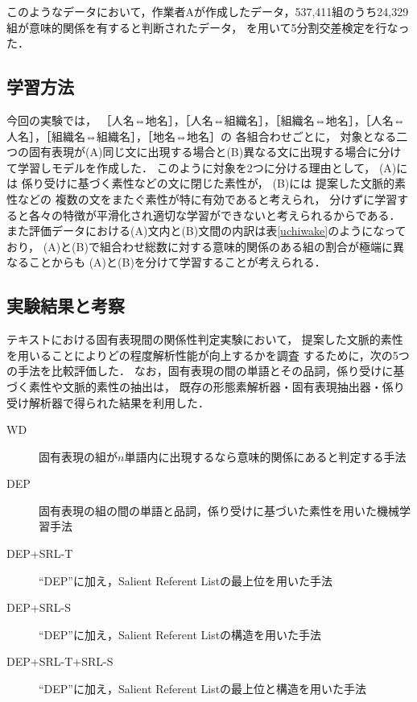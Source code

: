 \documentclass[japanese]{jnlp_1.4}
\begin{document}
このようなデータにおいて，作業者Aが作成したデータ，537,411組のうち24,329組が意味的関係を有すると判断されたデータ，
を用いて5分割交差検定を行なった．


\subsection{学習方法}
\label{method}

今回の実験では，
［人名⇔地名］，［人名⇔組織名］，［組織名⇔地名］，［人名⇔人名］，［組織名⇔組織名］，［地名⇔地名］の
各組合わせごとに，
対象となる二つの固有表現が(A)同じ文に出現する場合と(B)異なる文に出現する場合に分けて学習しモデルを作成した．
このように対象を2つに分ける理由として，
(A)には
係り受けに基づく素性などの文に閉じた素性が，
(B)には
提案した文脈的素性などの
複数の文をまたぐ素性が特に有効であると考えられ，
分けずに学習すると各々の特徴が平滑化され適切な学習ができないと考えられるからである．
また評価データにおける(A)文内と(B)文間の内訳は表\ref{uchiwake}のようになっており，
(A)と(B)で組合わせ総数に対する意味的関係のある組の割合が極端に異なることからも
(A)と(B)を分けて学習することが考えられる．


\subsection{実験結果と考察}
\label{result}

テキストにおける固有表現間の関係性判定実験において，
提案した文脈的素性を用いることによりどの程度解析性能が向上するかを調査
するために，次の5つの手法を比較評価した．
なお，固有表現の間の単語とその品詞，係り受けに基づく素性や文脈的素性の抽出は，
既存の形態素解析器・固有表現抽出器・係り受け解析器で得られた結果を利用した．

\vspace{1\baselineskip}
\begin{description}
\item [WD]固有表現の組が$n$単語内に出現するなら意味的関係にあると判定する手法
\item [DEP]固有表現の組の間の単語と品詞，係り受けに基づいた素性を用いた機械学習手法
\item [DEP+SRL-T]``DEP''に加え，Salient Referent Listの最上位を用いた手法
\item [DEP+SRL-S]``DEP''に加え，Salient Referent Listの構造を用いた手法
\item [DEP+SRL-T+SRL-S]``DEP''に加え，Salient Referent Listの最上位と構造を用いた手法
\end{description}
\vspace{1\baselineskip}
\end{document}
